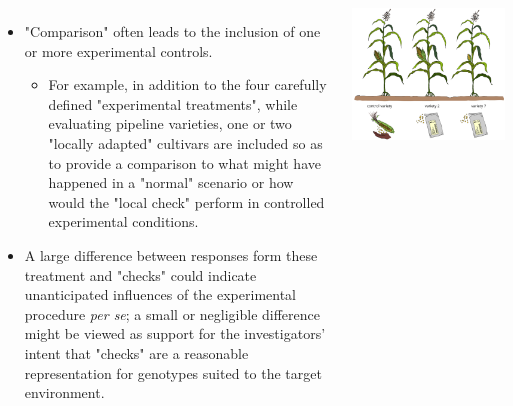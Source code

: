 \documentclass[
  ignorenonframetext,
  aspectratio=169]{beamer}
\begin{document}
\begin{frame}{}
\protect\hypertarget{section-5}{}
\begin{columns}[T, onlytextwidth]
\begin{itemize}
\item "Comparison" often leads to the inclusion of one or more experimental controls.
  \begin{itemize}
  \footnotesize
  \item For example, in addition to the four carefully defined "experimental treatments", while evaluating pipeline varieties, one or two "locally adapted" cultivars are included so as to provide a comparison to what might have happened in a "normal" scenario or how would the "local check" perform in controlled experimental conditions.
  \end{itemize}
\item A large difference between responses form these treatment and "checks" could indicate unanticipated influences of the experimental procedure \textit{per se}; a small or negligible difference might be viewed as support for the investigators' intent that "checks" are a reasonable representation for genotypes suited to the target environment.
\end{itemize}


\begin{center}\includegraphics[width=0.98\linewidth]{./images/local_check} \end{center}

\end{columns}
\end{frame}
\end{document}
